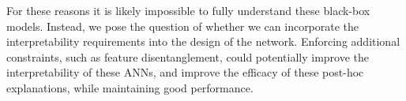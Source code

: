 For these reasons it is likely impossible to fully understand these black-box models. Instead, we pose the question of whether we can incorporate the interpretability requirements into the design of the network. Enforcing additional constraints, such as feature disentanglement, could potentially improve the interpretability of these ANNs, and improve the efficacy of these post-hoc explanations, while maintaining good performance. %






%
%
%
%		
%		
%		
%	
%	
%	




